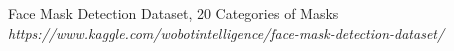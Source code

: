 \begin{thebibliography}{9}
Face Mask Detection Dataset, 20 Categories of Masks
\textit{https://www.kaggle.com/wobotintelligence/face-mask-detection-dataset/}
\end{thebibliography}
